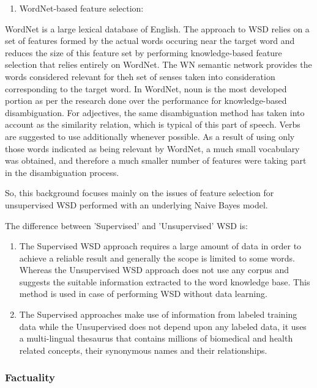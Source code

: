 \begin{enumerate}
	\item WordNet-based feature selection:
\end{enumerate}
WordNet is a large lexical database of English. The approach to WSD relies on a set of features formed by the actual words occuring near the target word and reduces the size of this feature set by performing knowledge-based feature selection that relies entirely on WordNet.
The WN semantic network provides the words considered relevant for theh set of senses taken into consideration corresponding to the target word.
In WordNet, noun is the most developed portion as per the research done over the performance for knowledge-based disambiguation.
For adjectives, the same disambiguation method has taken into account as the similarity relation, which  is typical of this part of speech.
Verbs are suggested to use additionally whenever possible.
As a result of using only those words indicated as being relevant by WordNet, a much small vocabulary was obtained, and therefore a much smaller number of features were taking part in the disambiguation process.

So, this background focuses mainly on the issues of feature selection for unsupervised WSD performed with an underlying Naive Bayes model.

The difference between 'Supervised' and 'Unsupervised' WSD is:

\begin{enumerate}
	\item The Supervised WSD approach requires a large amount of data in order to achieve a reliable result and generally the scope is limited to some words. 
	Whereas the Unsupervised WSD approach does not use any corpus and suggests the suitable information extracted to the word knowledge base.
	This method is used in case of performing WSD without data learning.
	\item The Supervised approaches make use of information from labeled training data while the Unsupervised does not depend upon any labeled data, it uses a multi-lingual thesaurus that contains millions of biomedical and health related concepts, their synonymous names and their relationships.
\end{enumerate}

\subsubsection*{Factuality}

